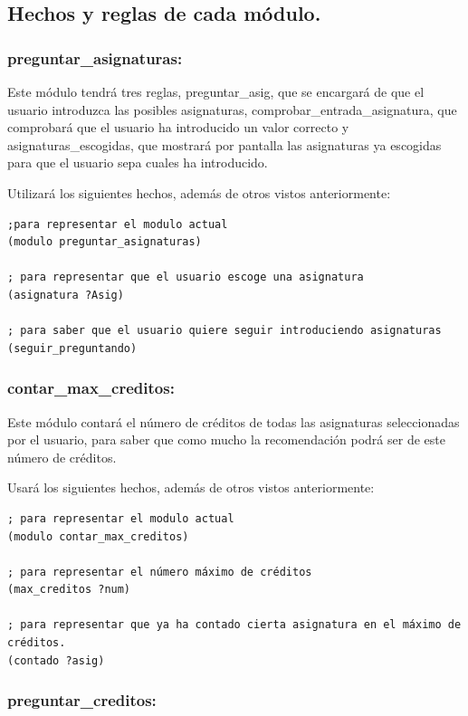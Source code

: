 \documentclass[12pt, spanish]{article}
\begin{document}
\subsection{Hechos y reglas de cada módulo.}

\subsubsection*{preguntar\_asignaturas:}

Este módulo tendrá tres reglas, preguntar\_asig, que se encargará de que el usuario introduzca las posibles asignaturas, comprobar\_entrada\_asignatura, que comprobará que el usuario ha introducido un valor correcto y asignaturas\_escogidas, que mostrará por pantalla las asignaturas ya escogidas para que el usuario sepa cuales ha introducido.

Utilizará los siguientes hechos, además de otros vistos anteriormente:

\begin{lstlisting}
;para representar el modulo actual
(modulo preguntar_asignaturas)

; para representar que el usuario escoge una asignatura
(asignatura ?Asig)

; para saber que el usuario quiere seguir introduciendo asignaturas
(seguir_preguntando)
\end{lstlisting}


\subsubsection*{contar\_max\_creditos:}

Este módulo contará el número de créditos de todas las asignaturas seleccionadas por el usuario, para saber que como mucho la recomendación podrá ser de este número de créditos.

Usará los siguientes hechos, además de otros vistos anteriormente:
\begin{lstlisting}
; para representar el modulo actual
(modulo contar_max_creditos)

; para representar el número máximo de créditos
(max_creditos ?num)

; para representar que ya ha contado cierta asignatura en el máximo de créditos.
(contado ?asig)
\end{lstlisting}



\subsubsection*{preguntar\_creditos:}
\end{document}
